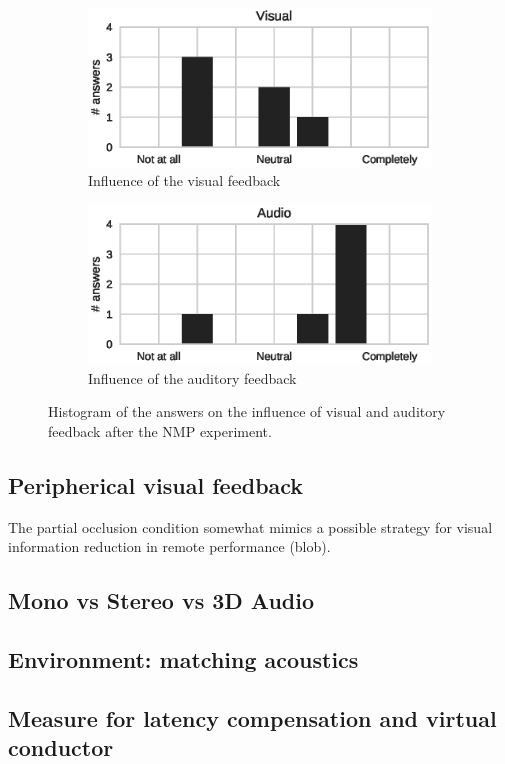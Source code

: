   
\begin{figure}[t]
	\centering
	\begin{subfigure}[t]{.48\columnwidth}
		\centering        
		\includegraphics[trim={.5cm 0cm 1cm 0cm},clip,width=\textwidth]{img/Visual}
		\caption{Influence of the visual feedback}
		\label{subfig:visual}
	\end{subfigure}
	\begin{subfigure}[t]{.48\columnwidth}
	\centering        
	\includegraphics[trim={1.5cm 0cm 0cm 0cm},clip,width=\textwidth]{img/Audio}
	\caption{Influence of the auditory feedback}
	\label{subfig:audio}
\end{subfigure}
	\quad 
	\caption{Histogram of the answers on the influence of visual and auditory feedback after the NMP experiment.}\label{fig:va}
\end{figure}  
  
\subsection{Peripherical visual feedback}
The partial occlusion condition somewhat mimics a possible strategy for visual information reduction in remote performance (blob). 


\subsection{Mono vs Stereo vs 3D Audio}

\subsection{Environment: matching acoustics}

\subsection{Measure for latency compensation and virtual conductor}


